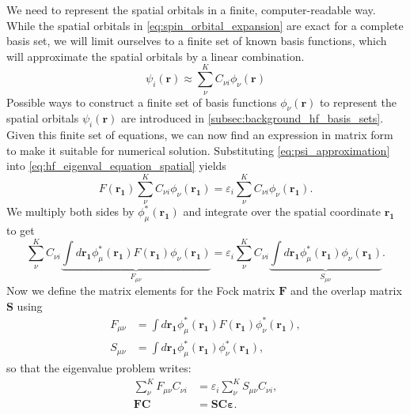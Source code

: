 We need to represent the spatial orbitals in a finite, computer-readable way. While the spatial orbitals in \autoref{eq:spin_orbital_expansion} are exact for a complete basis set, we will limit ourselves to a finite set of known basis functions, which will approximate the spatial orbitals by a linear combination.
\begin{equation}
    \label{eq:psi_approximation}
    \psi_i(\mathbf{r}) \approx \sum_{\nu}^{K} C_{\nu i} \phi_\nu(\mathbf{r})
\end{equation}
Possible ways to construct a finite set of basis functions $\phi_\nu(\mathbf{r})$ to represent the spatial orbitals $\psi_i(\mathbf{r})$ are introduced in \autoref{subsec:background_hf_basis_sets}. \\
Given this finite set of equations, we can now find an expression in matrix form to make it suitable for numerical solution.
Substituting \autoref{eq:psi_approximation} into \autoref{eq:hf_eigenval_equation_spatial} yields
\begin{equation}
    \label{eq:roothhaan_intermediate_1}
    F(\mathbf{r_1}) \sum_{\nu}^{K} C_{\nu i} \phi_\nu(\mathbf{r_1}) = \varepsilon_i \sum_{\nu}^{K} C_{\nu i} \phi_\nu(\mathbf{r_1}).
\end{equation}
We multiply both sides by $\phi_\mu^*(\mathbf{r_1})$ and integrate over the spatial coordinate $\mathbf{r_1}$ to get
\begin{equation}
    \label{eq:roothaan_equations}
        \sum_{\nu}^{K} C_{\nu i} \underbrace{\int d\mathbf{r_1} \phi_\mu^*(\mathbf{r_1}) F(\mathbf{r_1}) \phi_\nu(\mathbf{r_1})}_{F_{\mu\nu}} = \varepsilon_i \sum_{\nu}^{K} C_{\nu i} \underbrace{\int d\mathbf{r_1} \phi_\mu^*(\mathbf{r_1})\phi_\nu(\mathbf{r_1})}_{S_{\mu\nu}}.
\end{equation}
Now we define the matrix elements for the Fock matrix $\mathbf{F}$ and the overlap matrix $\mathbf{S}$ using
\begin{subequations}
    \label{eq:roothaan_matrices}
    \begin{align}
        F_{\mu \nu} &= \int d\mathbf{r_1} \phi_\mu^*(\mathbf{r_1}) F(\mathbf{r_1}) \phi_\nu^*(\mathbf{r_1}), \label{eq:roothaan_mat_F}\\
        S_{\mu \nu} &= \int d\mathbf{r_1} \phi_\mu^*(\mathbf{r_1}) \phi_\nu^*(\mathbf{r_1}),
    \end{align}
\end{subequations}
so that the eigenvalue problem writes:
\begin{subequations}
    \begin{align}
        \sum_{\nu}^{K} F_{\mu\nu} C_{\nu i}  &= \varepsilon_i \sum_{\nu}^{K} S_{\mu\nu} C_{\nu i},\\
        \mathbf{FC} &= \mathbf{SC} \boldsymbol{\varepsilon}.    \label{eq:roothaan_equations_matrix}
    \end{align}
\end{subequations} 

